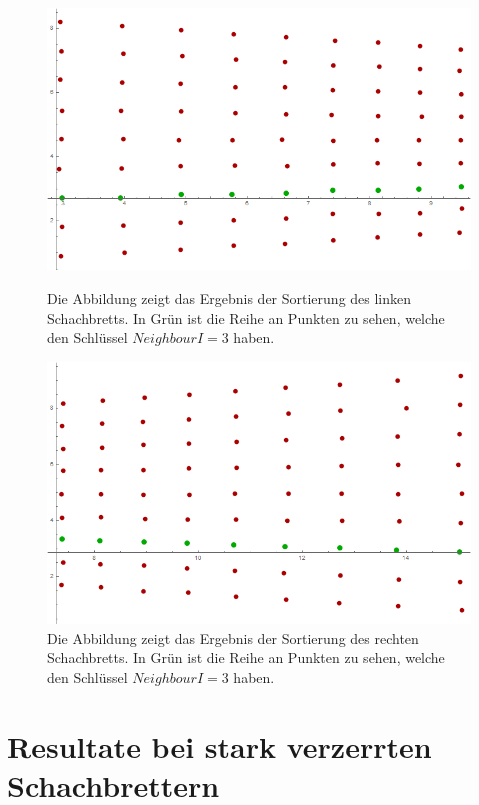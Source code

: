 \begin{figure}[!htb]
 	\includegraphics[width=\linewidth]{images/ChessBoardLeftAlg.png}
	\caption[Ergebnis des Sortierungsalgorithmus: Schachbrett auf linker Seite]{Die Abbildung zeigt das Ergebnis der Sortierung des linken Schachbretts. In Grün ist die Reihe an Punkten zu sehen, welche den Schlüssel $NeighbourI = 3$ haben.}
	\label{fig:ChessBoardLeftAlg}
	\endminipage\hfill
	\includegraphics[width=\linewidth]{images/ChessBoardRightAlg.png}
	\caption[Ergebnis des Sortierungsalgorithmus: Schachbrett auf linker Seite]{Die Abbildung zeigt das Ergebnis der Sortierung des rechten Schachbretts. In Grün ist die Reihe an Punkten zu sehen, welche den Schlüssel $NeighbourI = 3$ haben.}
	\label{fig:ChessBoardRightAlg}
	\endminipage\hfill
\end{figure}
\pagebreak


\section{Resultate bei stark verzerrten Schachbrettern}
\label{sec:SchachAlgBeispiele}


